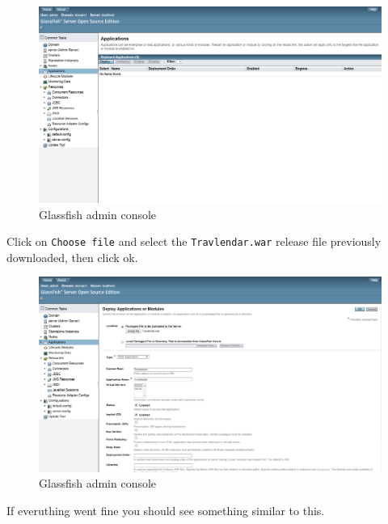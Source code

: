\begin{figure}[H]
\begin{center}
		\includegraphics[width=1.1\textwidth]{images/glassfishconsole}
		\caption{Glassfish admin console}
		
\end{center}
\end{figure}

Click on \texttt{Choose file} and select the \texttt{Travlendar.war} release file previously downloaded, then click ok.

\begin{figure}[H]
\begin{center}
		\includegraphics[width=1.1\textwidth]{images/glassfishdeploy2}
		\caption{Glassfish admin console}
		
\end{center}
\end{figure}

If everuthing went fine you should see something similar to this.

